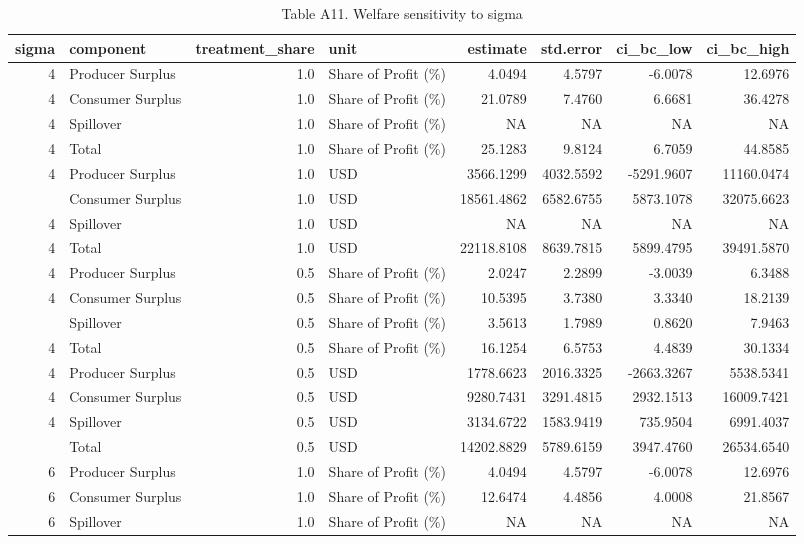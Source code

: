 \begin{table}

\caption{Table A11. Welfare sensitivity to sigma}
\centering
\begin{tabular}[t]{rlrlrrrr}
\toprule
sigma & component & treatment\_share & unit & estimate & std.error & ci\_bc\_low & ci\_bc\_high\\
\midrule
4 & Producer Surplus & 1.0 & Share of Profit (\%) & 4.0494 & 4.5797 & -6.0078 & 12.6976\\
4 & Consumer Surplus & 1.0 & Share of Profit (\%) & 21.0789 & 7.4760 & 6.6681 & 36.4278\\
4 & Spillover & 1.0 & Share of Profit (\%) & NA & NA & NA & NA\\
4 & Total & 1.0 & Share of Profit (\%) & 25.1283 & 9.8124 & 6.7059 & 44.8585\\
4 & Producer Surplus & 1.0 & USD & 3566.1299 & 4032.5592 & -5291.9607 & 11160.0474\\
\addlinespace
4 & Consumer Surplus & 1.0 & USD & 18561.4862 & 6582.6755 & 5873.1078 & 32075.6623\\
4 & Spillover & 1.0 & USD & NA & NA & NA & NA\\
4 & Total & 1.0 & USD & 22118.8108 & 8639.7815 & 5899.4795 & 39491.5870\\
4 & Producer Surplus & 0.5 & Share of Profit (\%) & 2.0247 & 2.2899 & -3.0039 & 6.3488\\
4 & Consumer Surplus & 0.5 & Share of Profit (\%) & 10.5395 & 3.7380 & 3.3340 & 18.2139\\
\addlinespace
4 & Spillover & 0.5 & Share of Profit (\%) & 3.5613 & 1.7989 & 0.8620 & 7.9463\\
4 & Total & 0.5 & Share of Profit (\%) & 16.1254 & 6.5753 & 4.4839 & 30.1334\\
4 & Producer Surplus & 0.5 & USD & 1778.6623 & 2016.3325 & -2663.3267 & 5538.5341\\
4 & Consumer Surplus & 0.5 & USD & 9280.7431 & 3291.4815 & 2932.1513 & 16009.7421\\
4 & Spillover & 0.5 & USD & 3134.6722 & 1583.9419 & 735.9504 & 6991.4037\\
\addlinespace
4 & Total & 0.5 & USD & 14202.8829 & 5789.6159 & 3947.4760 & 26534.6540\\
6 & Producer Surplus & 1.0 & Share of Profit (\%) & 4.0494 & 4.5797 & -6.0078 & 12.6976\\
6 & Consumer Surplus & 1.0 & Share of Profit (\%) & 12.6474 & 4.4856 & 4.0008 & 21.8567\\
6 & Spillover & 1.0 & Share of Profit (\%) & NA & NA & NA & NA\\

\end{tabular}
\end{table}
